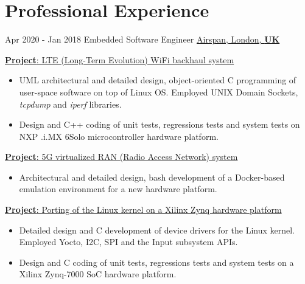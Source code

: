\documentclass[letterpaper]{twentysecondcv} %
\begin{document}
\section{Professional Experience}

\begin{twenty}
    \twentyitem
    	{Apr 2020 -}
		{Jan 2018}
        {Embedded Software Engineer}
        {\href{https://www.airspan.com/}{Airspan, London, \textbf{UK}}}
        {}
        {
            \vspace{2 mm}
            \underline{\textbf{Project}: LTE (Long-Term Evolution) WiFi backhaul system}

            \vspace{2 mm}
            \begin{itemize}
                \item UML architectural and detailed design, object-oriented C programming of user-space software on top of Linux OS. Employed UNIX Domain Sockets, \textit{tcpdump} and \textit{iperf} libraries.
                \item Design and C++ coding of unit tests, regressions tests and system tests on NXP .i.MX 6Solo microcontroller hardware platform.
            \end{itemize}

            \vspace{2 mm}
            \underline{\textbf{Project}: 5G virtualized RAN (Radio Access Network) system}

            \vspace{2 mm}
            \begin{itemize}
                \item Architectural and detailed design, bash development of a Docker-based emulation environment for a new hardware platform.
            \end{itemize}

            \vspace{2 mm}
            \underline{\textbf{Project}: Porting of the Linux kernel on a Xilinx Zynq hardware platform}

            \vspace{2 mm}
            \begin{itemize}
                \item Detailed design and C development of device drivers for the Linux kernel. Employed Yocto, I2C, SPI and the Input subsystem APIs.
                \item Design and C coding of unit tests, regressions tests and system tests on a Xilinx Zynq-7000 SoC hardware platform.
            \end{itemize}

}
\end{twenty}
\end{document}
